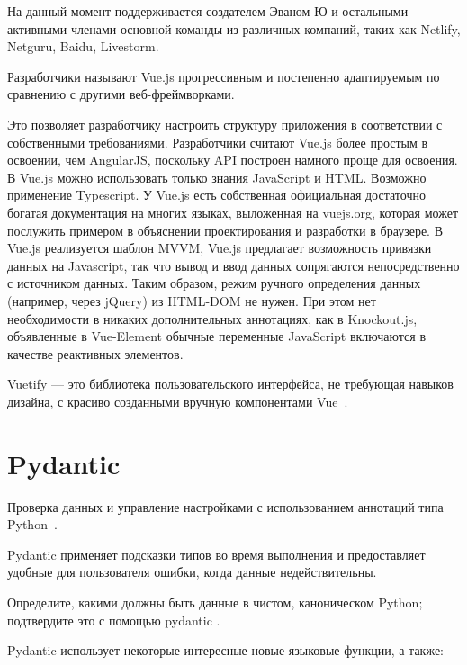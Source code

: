 \documentclass{altsu-report}
\begin{document}
На данный момент поддерживается создателем Эваном Ю и остальными активными членами основной команды из различных компаний, таких как Netlify, Netguru, Baidu, Livestorm.

Разработчики называют Vue.js прогрессивным и постепенно адаптируемым по сравнению с другими веб-фреймворками.

Это позволяет разработчику настроить структуру приложения в соответствии с собственными требованиями. Разработчики считают Vue.js более простым в освоении, чем AngularJS, поскольку API построен намного проще для освоения. В Vue.js можно использовать только знания JavaScript и HTML. Возможно применение Typescript. У Vue.js есть собственная официальная достаточно богатая документация на многих языках, выложенная на vuejs.org, которая может послужить примером в объяснении проектирования и разработки в браузере. В Vue.js реализуется шаблон MVVM, Vue.js предлагает возможность привязки данных на Javascript, так что вывод и ввод данных сопрягаются непосредственно с источником данных. Таким образом, режим ручного определения данных (например, через jQuery) из HTML-DOM не нужен. При этом нет необходимости в никаких дополнительных аннотациях, как в Knockout.js, объявленные в Vue-Element обычные переменные JavaScript включаются в качестве реактивных элементов.

Vuetify --- это библиотека пользовательского интерфейса, не требующая навыков дизайна, с красиво созданными вручную компонентами Vue~\cite{vuetify}.

\section*{Pydantic}

Проверка данных и управление настройками с использованием аннотаций типа Python~\cite{pydantic}.

Pydantic применяет подсказки типов во время выполнения и предоставляет удобные для пользователя ошибки, когда данные недействительны.

Определите, какими должны быть данные в чистом, каноническом Python; подтвердите это с помощью pydantic .

Pydantic использует некоторые интересные новые языковые функции, а также:
\end{document}
